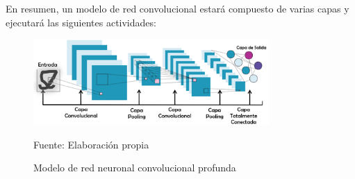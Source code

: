 En resumen, un modelo de red convolucional estará compuesto de varias capas y ejecutará las siguientes actividades:
\begin{figure}[H]
	\begin{center}
	\includegraphics[width=0.8\textwidth]{images/marcoteorico/modelo}
	\end{center}
	\begin{center}
	\caption{\small{Modelo de red neuronal convolucional profunda}}
	{\small{Fuente: Elaboración propia}}
	\end{center}
	\vspace{-1.5em}
	\end{figure}

